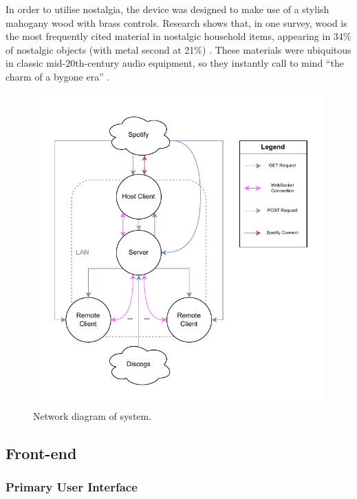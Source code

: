                 In order to utilise nostalgia, the device was designed to make use of a stylish mahogany wood with brass controls. Research shows that, in one survey, wood is the most frequently cited material in nostalgic household items, appearing in 34\% of nostalgic objects (with metal second at 21\%) \cite{Skinner2022}. These materials were ubiquitous in classic mid-20th-century audio equipment, so they instantly call to mind ``the charm of a bygone era'' \cite{LookInTheAttic2024}.
    
                \begin{figure}[h]
                    \centering
                    \includegraphics[width=\textwidth]{images/VTT_network.NetworkDiagram.pdf}
                    \caption{Network diagram of system. }
                    \label{fig:networkDiagram}
                \end{figure}
        
        \subsection{Front-end}
            \subsubsection{Primary User Interface}
    
